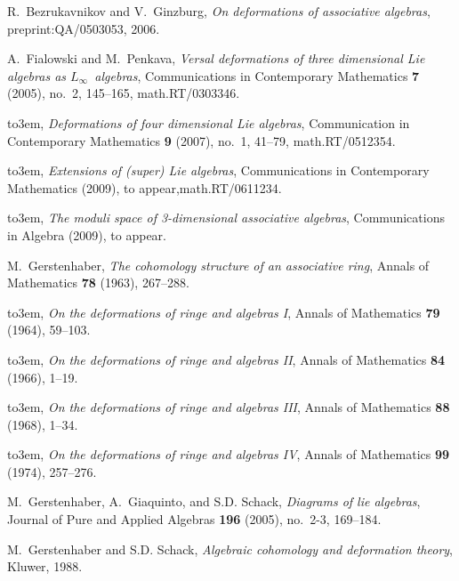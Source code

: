 \documentclass[12pt]{amsart}
\theoremstyle{definition}
\begin{document}

\providecommand{\bysame}{\leavevmode\hbox to3em{\hrulefill}\thinspace}
\providecommand{\MR}{\relax\ifhmode\unskip\space\fi MR }
\providecommand{\MRhref}[2]{  \href{http://www.ams.org/mathscinet-getitem?mr=#1}{#2}
}
\providecommand{\href}[2]{#2}
\begin{thebibliography}{10}

R.~Bezrukavnikov and V.~Ginzburg, \emph{On deformations of associative
  algebras}, preprint:QA/0503053, 2006.

A.~Fialowski and M.~Penkava, \emph{Versal deformations of three dimensional
  {L}ie algebras as {\mbox{$L_\infty$}}\ algebras}, Communications in Contemporary
  Mathematics \textbf{7} (2005), no.~2, 145--165, math.RT/0303346.

\bysame, \emph{Deformations of four dimensional {L}ie algebras}, Communication
  in Contemporary Mathematics \textbf{9} (2007), no.~1, 41--79,
  math.RT/0512354.

\bysame, \emph{Extensions of (super) {L}ie algebras}, Communications in
  Contemporary Mathematics (2009), to appear,math.RT/0611234.

\bysame, \emph{The moduli space of 3-dimensional associative algebras},
  Communications in Algebra (2009), to appear.

M.~Gerstenhaber, \emph{The cohomology structure of an associative ring}, Annals
  of Mathematics \textbf{78} (1963), 267--288.

\bysame, \emph{On the deformations of ringe and algebras {I}}, Annals of
  Mathematics \textbf{79} (1964), 59--103.

\bysame, \emph{On the deformations of ringe and algebras {II}}, Annals of
  Mathematics \textbf{84} (1966), 1--19.

\bysame, \emph{On the deformations of ringe and algebras {III}}, Annals of
  Mathematics \textbf{88} (1968), 1--34.

\bysame, \emph{On the deformations of ringe and algebras {IV}}, Annals of
  Mathematics \textbf{99} (1974), 257--276.

M.~Gerstenhaber, A.~Giaquinto, and S.D. Schack, \emph{Diagrams of lie
  algebras}, Journal of Pure and Applied Algebras \textbf{196} (2005), no.~2-3,
  169--184.

M.~Gerstenhaber and S.D. Schack, \emph{Algebraic cohomology and deformation
  theory}, Kluwer, 1988.


\end{thebibliography}
\end{document}
